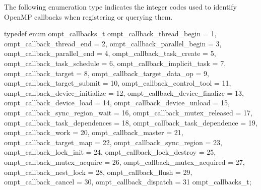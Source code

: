 The following enumeration type indicates the integer codes used to identify
OpenMP callbacks when registering or querying them.


\begin{ccppspecific}
\begin{omptEnum}
typedef enum ompt_callbacks_t {
  ompt_callback_thread_begin             = 1,
  ompt_callback_thread_end               = 2,
  ompt_callback_parallel_begin           = 3,
  ompt_callback_parallel_end             = 4,
  ompt_callback_task_create              = 5,
  ompt_callback_task_schedule            = 6,
  ompt_callback_implicit_task            = 7,
  ompt_callback_target                   = 8,
  ompt_callback_target_data_op           = 9,
  ompt_callback_target_submit            = 10,
  ompt_callback_control_tool             = 11,
  ompt_callback_device_initialize        = 12,
  ompt_callback_device_finalize          = 13,
  ompt_callback_device_load              = 14,
  ompt_callback_device_unload            = 15,
  ompt_callback_sync_region_wait         = 16,
  ompt_callback_mutex_released           = 17,
  ompt_callback_task_dependences         = 18,
  ompt_callback_task_dependence          = 19,
  ompt_callback_work                     = 20,
  ompt_callback_master                   = 21,
  ompt_callback_target_map               = 22,
  ompt_callback_sync_region              = 23,
  ompt_callback_lock_init                = 24,
  ompt_callback_lock_destroy             = 25,
  ompt_callback_mutex_acquire            = 26,
  ompt_callback_mutex_acquired           = 27,
  ompt_callback_nest_lock                = 28,
  ompt_callback_flush                    = 29,
  ompt_callback_cancel                   = 30,
  ompt_callback_dispatch                 = 31
} ompt_callbacks_t;
\end{omptEnum}
\end{ccppspecific}



